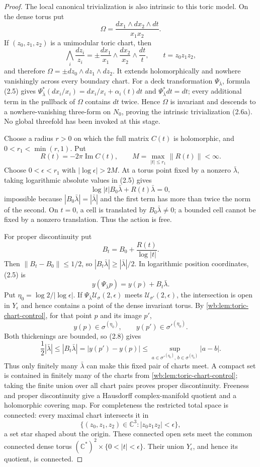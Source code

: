 \begin{proof}
The local canonical trivialization is also intrinsic to this toric model.
On the dense torus put
\[
 \Omega=\frac{dx_1\wedge dx_2\wedge dt}{x_1x_2}.
\]
If \((z_0,z_1,z_2)\) is a unimodular toric chart, then
\[
 \bigwedge_i\frac{dz_i}{z_i}
 =\pm\frac{dx_1}{x_1}\wedge\frac{dx_2}{x_2}\wedge\frac{dt}{t},
 \qquad t=z_0z_1z_2,
\]
and therefore \(\Omega=\pm dz_0\wedge dz_1\wedge dz_2\).  It extends
holomorphically and nowhere vanishingly across every boundary chart.
For a deck transformation \(\Psi_{\bar\lambda}\), formula (2.5) gives
\(\Psi_{\bar\lambda}^*(dx_i/x_i)=dx_i/x_i+\alpha_i(t)dt\) and
\(\Psi_{\bar\lambda}^*dt=dt\); every additional term in the pullback of
\(\Omega\) contains \(dt\) twice.  Hence \(\Omega\) is invariant and descends
to a nowhere-vanishing three-form on \(N_0\), proving the intrinsic
trivialization (2.6a).  No global threefold has been invoked at this stage.

Choose a radius \(r>0\) on which the full matrix \(C(t)\) is holomorphic,
and \(0<r_1<\min(r,1)\).  Put
\[
 R(t)=-2\pi\operatorname{Im}C(t),\qquad
 M=\max_{|t|\le r_1}\|R(t)\|<\infty.
\]
Choose \(0<\epsilon<r_1\) with \(|\log\epsilon|>2M\).
At a torus point fixed by a nonzero
\(\bar\lambda\), taking logarithmic absolute values in (2.5) gives
\[
 \log|t|B_0\bar\lambda+R(t)\bar\lambda=0,
\]
impossible because \(|B_0\bar\lambda|=|\bar\lambda|\) and the first term
has more than twice the norm of the second.  On \(t=0\), a cell is translated
by \(B_0\bar\lambda\ne0\); a bounded cell cannot be fixed by a nonzero
translation.  Thus the action is free.

For proper discontinuity put
\[
 B_t=B_0+\frac{R(t)}{\log|t|}.
\]
Then \(\|B_t-B_0\|\le1/2\), so
\(|B_t\bar\lambda|\ge|\bar\lambda|/2\).  In logarithmic position
coordinates, (2.5) is
\[
 y(\Psi_{\bar\lambda}p)=y(p)+B_t\bar\lambda.
\tag{2.8}
\]
Put \(\eta_0=\log2/|\log\epsilon|\).  If
\(\Psi_{\bar\lambda}\mathcal U_\sigma(2,\epsilon)\) meets
\(\mathcal U_{\sigma'}(2,\epsilon)\), the intersection is open in
\(Y_\epsilon\) and hence contains a
point of the dense invariant torus.  By \cref{wb:lem:toric-chart-control}, for
that point \(p\) and its image \(p'\),
\[
 y(p)\in\sigma^{(\eta_0)},\qquad
 y(p')\in{\sigma'}^{(\eta_0)}.
\]
Both thickenings are bounded, so (2.8) gives
\[
 \frac12|\bar\lambda|
 \le |B_t\bar\lambda|
 =|y(p')-y(p)|
 \le \sup_{a\in{\sigma'}^{(\eta_0)},\,b\in\sigma^{(\eta_0)}}|a-b|.
\]
Thus only finitely many \(\bar\lambda\) can make this fixed pair of charts
meet.  A compact set is contained in finitely many of the charts from
\cref{wb:lem:toric-chart-control}; taking the finite union over all chart pairs
proves proper discontinuity.  Freeness and proper discontinuity give a
Hausdorff complex-manifold quotient and a holomorphic covering map.
For completeness the restricted total space is connected: every maximal
chart intersects it in
\[
 \{(z_0,z_1,z_2)\in\mathbb C^3:|z_0z_1z_2|<\epsilon\},
\]
a set star shaped about the origin.  These connected open sets meet the
common connected dense torus
\((\mathbb C^*)^2\times\{0<|t|<\epsilon\}\).  Their union
\(Y_\epsilon\), and hence its quotient, is connected.


\end{proof}

